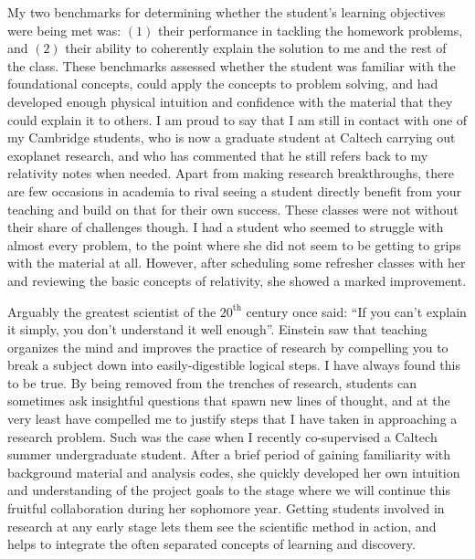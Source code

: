 \documentclass[11pt,letterpaper,sans]{moderncv} %
\begin{document}
My two benchmarks for determining whether the student's learning objectives were being met was: $(1)$ their performance in tackling the homework problems, and  $(2)$ their ability to coherently explain the solution to me and the rest of the class. These benchmarks assessed whether the student was familiar with the foundational concepts, could apply the concepts to problem solving, and had developed enough physical intuition and confidence with the material that they could explain it to others. I am proud to say that I am still in contact with one of my Cambridge students, who is now a graduate student at Caltech carrying out exoplanet research, and who has commented that he still refers back to my relativity notes when needed. Apart from making research breakthroughs, there are few occasions in academia to rival seeing a student directly benefit from your teaching and build on that for their own success. These classes were not without their share of challenges though. I had a student who seemed to struggle with almost every problem, to the point where she did not seem to be getting to grips with the material at all. However, after scheduling some refresher classes with her and reviewing the basic concepts of relativity, she showed a marked improvement.
\vspace{2mm}

Arguably the greatest scientist of the $20^\mathrm{th}$ century once said: ``If you can't explain it simply, you don't understand it well enough''. Einstein saw that teaching organizes the mind and improves the practice of research by compelling you to break a subject down into easily-digestible logical steps. I have always found this to be true. %
By being removed from the trenches of research, students can sometimes ask insightful questions that spawn new lines of thought, and at the very least have compelled me to justify steps that I have taken in approaching a research problem. Such was the case when I recently co-supervised a Caltech summer undergraduate student. After a brief period of gaining familiarity with background material and analysis codes, she quickly developed her own intuition and understanding of the project goals to the stage where we will continue this fruitful collaboration during her sophomore year. Getting students involved in research at any early stage lets them see the scientific method in action, and helps to integrate the often separated concepts of learning and discovery.
\vspace{2mm}
\end{document}
